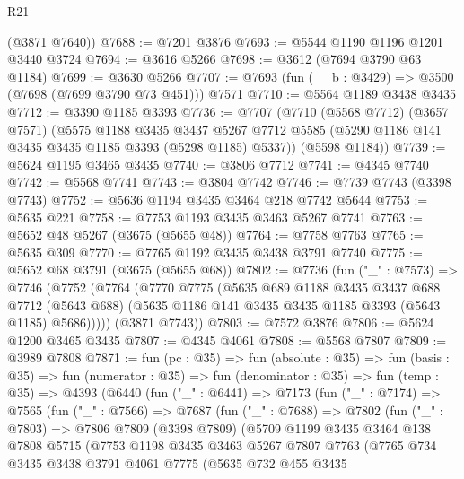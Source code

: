 \begin{lexlean}{R21}
\begin{coremodule}
      (@3871 @7640))
@7688 := @7201 @3876
@7693 := @5544 @1190 @1196 @1201 @3440 @3724
@7694 := @3616 @5266
@7698 := @3612 (@7694 @3790 @63 @1184)
@7699 := @3630 @5266
@7707 := @7693 (fun (__b : @3429) => @3500 (@7698 (@7699 @3790 @73 @451))) @7571
@7710 := @5564 @1189 @3438 @3435
@7712 := @3390 @1185 @3393
@7736 := @7707
    (@7710
      (@5568 @7712)
      (@3657 @7571)
      (@5575
        @1188
        @3435
        @3437
        @5267
        @7712
        @5585
        (@5290 @1186 @141 @3435 @3435 @1185 @3393 (@5298 @1185) @5337))
      (@5598 @1184))
@7739 := @5624 @1195 @3465 @3435
@7740 := @3806 @7712
@7741 := @4345 @7740
@7742 := @5568 @7741
@7743 := @3804 @7742
@7746 := @7739 @7743 (@3398 @7743)
@7752 := @5636 @1194 @3435 @3464 @218 @7742 @5644
@7753 := @5635 @221
@7758 := @7753 @1193 @3435 @3463 @5267 @7741
@7763 := @5652 @48 @5267 (@3675 (@5655 @48))
@7764 := @7758 @7763
@7765 := @5635 @309
@7770 := @7765 @1192 @3435 @3438 @3791 @7740
@7775 := @5652 @68 @3791 (@3675 (@5655 @68))
@7802 := @7736
    (fun ("_" : @7573) =>
    @7746
      (@7752
        (@7764
          (@7770
            @7775
            (@5635
              @689
              @1188
              @3435
              @3437
              @688
              @7712
              (@5643 @688)
              (@5635 @1186 @141 @3435 @3435 @1185 @3393 (@5643 @1185) @5686)))))
      (@3871 @7743))
@7803 := @7572 @3876
@7806 := @5624 @1200 @3465 @3435
@7807 := @4345 @4061
@7808 := @5568 @7807
@7809 := @3989 @7808
@7871 := fun (pc : @35) =>
  fun (absolute : @35) =>
  fun (basis : @35) =>
  fun (numerator : @35) =>
  fun (denominator : @35) =>
  fun (temp : @35) =>
  @4393
    (@6440
      (fun ("_" : @6441) =>
      @7173
        (fun ("_" : @7174) =>
        @7565
          (fun ("_" : @7566) =>
          @7687
            (fun ("_" : @7688) =>
            @7802
              (fun ("_" : @7803) =>
              @7806
                @7809
                (@3398 @7809)
                (@5709
                  @1199
                  @3435
                  @3464
                  @138
                  @7808
                  @5715
                  (@7753
                    @1198
                    @3435
                    @3463
                    @5267
                    @7807
                    @7763
                    (@7765
                      @734
                      @3435
                      @3438
                      @3791
                      @4061
                      @7775
                      (@5635
                        @732
                        @455
                        @3435

\end{coremodule}
\end{lexlean}
